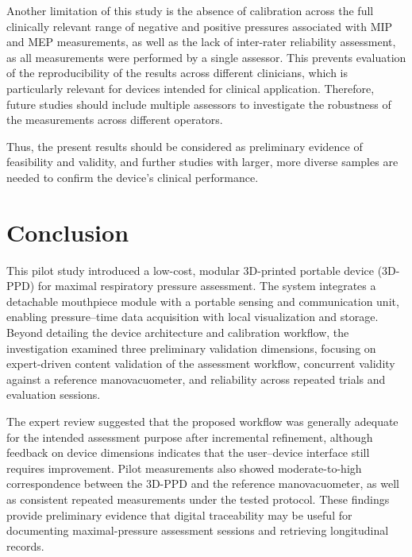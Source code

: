\documentclass{ieeeaccess}
\begin{document}
{{Another limitation of this study is the absence of calibration across the full clinically relevant range of negative and positive pressures associated with MIP and MEP measurements, as well as the lack of inter-rater reliability assessment, as all measurements were performed by a single assessor.} This prevents evaluation of the reproducibility of the results across different clinicians, which is particularly relevant for devices intended for clinical application. Therefore, future studies should include multiple assessors to investigate the robustness of the measurements across different operators.

{Thus, the present results should be considered as preliminary evidence of feasibility and validity, and further studies with larger, more diverse samples are needed to confirm the device's clinical performance.}

\section{Conclusion}
\label{sec:conclusion}
%
This {pilot} study introduced a low-cost, modular 3D-printed portable device (3D-PPD) for maximal respiratory pressure assessment. The system integrates a detachable mouthpiece module with a portable sensing and communication unit, enabling pressure--time data acquisition with local visualization and storage. Beyond detailing the device architecture and calibration workflow, the investigation examined three preliminary validation dimensions, focusing on expert-driven content validation of the assessment workflow, concurrent validity against a reference manovacuometer, and reliability across repeated trials and evaluation sessions.

{The expert review suggested that the proposed workflow was generally adequate for the intended assessment purpose after incremental refinement, although feedback on device dimensions indicates that the user--device interface still requires improvement. Pilot measurements also showed moderate-to-high correspondence between the 3D-PPD and the reference manovacuometer, as well as consistent repeated measurements under the tested protocol.} These findings provide preliminary evidence that digital traceability may be useful for documenting maximal-pressure assessment sessions and retrieving longitudinal records.

}
\end{document}
